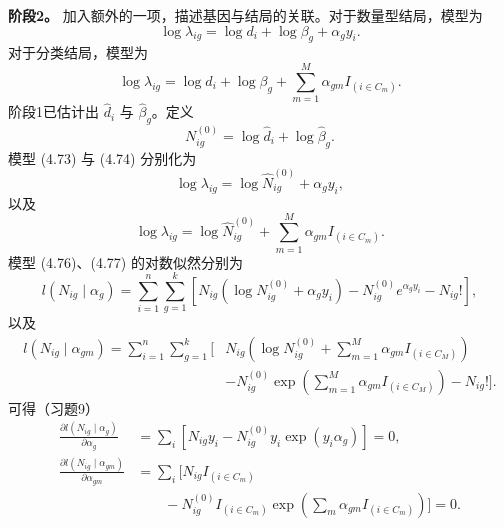 \par\medskip\noindent\textbf{阶段2。}
加入额外的一项，描述基因与结局的关联。对于数量型结局，模型为
\begin{equation}
\log\lambda_{ig}=\log d_i+\log\beta_g+\alpha_gy_i.
\tag{4.73}
\end{equation}
对于分类结局，模型为
\begin{equation}
\log\lambda_{ig}=\log d_i+\log\beta_g+\sum_{m=1}^{M}\alpha_{gm}I_{(i\in C_m)}.
\tag{4.74}
\end{equation}
阶段1已估计出 $\hat d_i$ 与 $\hat\beta_g$。定义
\begin{equation}
N_{ig}^{(0)}=\log\hat d_i+\log\hat\beta_g.
\tag{4.75}
\end{equation}
模型 (4.73) 与 (4.74) 分别化为
\begin{equation}
\log\lambda_{ig}=\log\hat N_{ig}^{(0)}+\alpha_gy_i,
\tag{4.76}
\end{equation}
以及
\begin{equation}
\log\lambda_{ig}=\log\hat N_{ig}^{(0)}+\sum_{m=1}^{M}\alpha_{gm}I_{(i\in C_m)}.
\tag{4.77}
\end{equation}
模型 (4.76)、(4.77) 的对数似然分别为
\begin{equation}
l(N_{ig}\mid\alpha_g)=\sum_{i=1}^{n}\sum_{g=1}^{k}
\left[N_{ig}(\log N_{ig}^{(0)}+\alpha_gy_i)-N_{ig}^{(0)}e^{\alpha_gy_i}-N_{ig}!\right],
\tag{4.78}
\end{equation}
以及
\begin{equation}
\begin{aligned}
l(N_{ig}\mid\alpha_{gm})=\sum_{i=1}^{n}\sum_{g=1}^{k}\biggl[{}
&N_{ig}\left(\log N_{ig}^{(0)}+\sum_{m=1}^{M}\alpha_{gm}I_{(i\in C_M)}\right)\\
&-N_{ig}^{(0)}\exp\left(\sum_{m=1}^{M}\alpha_{gm}I_{(i\in C_M)}\right)-N_{ig}!\biggr].
\end{aligned}
\tag{4.79}
\end{equation}
可得（习题9）
\begin{equation}
\begin{aligned}
\frac{\partial l(N_{ig}\mid\alpha_g)}{\partial\alpha_g}
&=\sum_i\left[N_{ig}y_i-N_{ig}^{(0)}y_i\exp(y_i\alpha_g)\right]=0,\\
\frac{\partial l(N_{ig}\mid\alpha_{gm})}{\partial\alpha_{gm}}
&=\sum_i\biggl[N_{ig}I_{(i\in C_m)}\\
&\qquad-N_{ig}^{(0)}I_{(i\in C_m)}\exp\left(\sum_m\alpha_{gm}I_{(i\in C_m)}\right)\biggr]=0.
\end{aligned}
\tag{4.80}
\end{equation}

